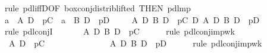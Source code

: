 \begin{isabellebody}
\isamarkupfalse%
\ {\isacharparenleft}rule\ pdl{\isacharunderscore}iffD{}{\isacharbrackleft}OF\ box{\isacharunderscore}conj{\isacharunderscore}distrib{\isacharunderscore}lifted{}{\isacharcomma}\ THEN\ pdl{\isacharunderscore}mp{\isacharbrackright}{\isacharparenright}\isanewline
\ \ \isamarkupfalse%
\ a{}{\isacharcolon}\ {\isachardoublequote}{\isasymturnstile}\ A\ {\isasymlongrightarrow}\isactrlsub D\ {\isacharbrackleft}{\isacharhash}\ p{\isacharbrackright}C{\isachardoublequote}\ \ a{}{\isacharcolon}\ {\isachardoublequote}{\isasymturnstile}\ B\ {\isasymlongrightarrow}\isactrlsub D\ {\isacharbrackleft}{\isacharhash}\ p{\isacharbrackright}D{\isachardoublequote}\isanewline
\ \ \isamarkupfalse%
\ {\isachardoublequote}{\isasymturnstile}\ {\isacharparenleft}A\ {\isasymand}\isactrlsub D\ B\ {\isasymlongrightarrow}\isactrlsub D\ {\isacharbrackleft}{\isacharhash}\ p{\isacharbrackright}C{\isacharparenright}\ {\isasymand}\isactrlsub D\ {\isacharparenleft}A\ {\isasymand}\isactrlsub D\ B\ {\isasymlongrightarrow}\isactrlsub D\ {\isacharbrackleft}{\isacharhash}\ p{\isacharbrackright}D{\isacharparenright}{\isachardoublequote}\isanewline
\ \ \isamarkupfalse%
\ {\isacharparenleft}rule\ pdl{\isacharunderscore}conjI{\isacharparenright}\isanewline
\ \ \ \ \isamarkupfalse%
\ {\isachardoublequote}{\isasymturnstile}\ A\ {\isasymand}\isactrlsub D\ B\ {\isasymlongrightarrow}\isactrlsub D\ {\isacharbrackleft}{\isacharhash}\ p{\isacharbrackright}C{\isachardoublequote}\isanewline
\ \ \ \ \isamarkupfalse%
\ {\isacharparenleft}rule\ pdl{\isacharunderscore}conj{\isacharunderscore}imp{\isacharunderscore}wk{}{\isacharparenright}\ \isanewline
\ \ \ \ \ \ \isamarkupfalse%
\ {\isachardoublequote}{\isasymturnstile}\ A\ {\isasymlongrightarrow}\isactrlsub D\ {\isacharbrackleft}{\isacharhash}\ p{\isacharbrackright}C{\isachardoublequote}\ \isamarkupfalse%
\isacommand{{\isachardot}}\isanewline
\ \ \ \ \isamarkupfalse%
\isanewline
\ \ \isamarkupfalse%
\isanewline
\ \ \ \ \isamarkupfalse%
\ {\isachardoublequote}{\isasymturnstile}\ A\ {\isasymand}\isactrlsub D\ B\ {\isasymlongrightarrow}\isactrlsub D\ {\isacharbrackleft}{\isacharhash}\ p{\isacharbrackright}D{\isachardoublequote}\isanewline
\ \ \ \ \isamarkupfalse%
\ {\isacharparenleft}rule\ pdl{\isacharunderscore}conj{\isacharunderscore}imp{\isacharunderscore}wk{}{\isacharparenright}\isanewline

\end{isabellebody}
